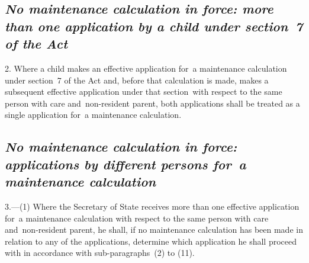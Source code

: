 \documentclass[12pt,a4paper]{article}
\begin{document}
%
%


\subsection*{\itshape No maintenance calculation in force: more than one application by a child under section~7 of the Act}

2.  Where a child makes an effective application for~a maintenance calculation under section~7 of the Act and, before that calculation is made, makes a subsequent effective application under that section~with respect to the same person with care and~non-resident parent, both applications shall be treated as a single application for~a maintenance calculation.

\subsection*{\itshape No maintenance calculation in force: applications by different persons for~a maintenance calculation}

3.---(1)  Where the Secretary of State receives more than one effective application for~a maintenance calculation with respect to the same person with care and~non-resident parent, he shall, if no maintenance calculation has been made in relation to any of the applications, determine which application he shall proceed with in accordance with sub-paragraphs~(2) to (11).
\end{document}
